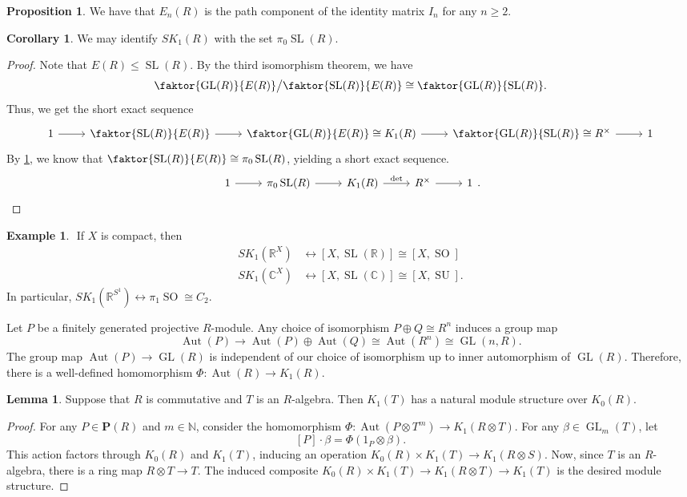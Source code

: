 \documentclass[10pt,letterpaper,cm]{nupset}
\theoremstyle{definition}
\newtheorem{exmp}[definition]{Example}
\theoremstyle{theorem}
\newtheorem{lemma}[definition]{Lemma}
\newtheorem{corollary}[definition]{Corollary}
\newtheorem{prop}[definition]{Proposition}
\theoremstyle{remark}
\newcommand{\C}{\mathbb C}
\newcommand{\N}{\mathbb N}
\renewcommand{\P}{\mathbf P}
\newcommand{\R}{\mathbb R}
\newcommand{\1}{\mathbf{1}}
\newcommand{\0}{\vec 0}
\DeclareMathOperator*{\GL}{GL}
\DeclareMathOperator*{\SL}{SL}
\DeclareMathOperator*{\SO}{SO}
\DeclareMathOperator*{\SU}{SU}
\DeclareMathOperator{\aut}{Aut}
\begin{document}
\begin{prop}\label{prev}
We have that $E_n(R)$ is the path component of the identity matrix $I_n$ for any $n\geq 2$.
\end{prop}

\begin{corollary}
We may identify $SK_1(R)$ with the set $\pi_0\SL(R)$. 
\end{corollary}
\begin{proof}
Note that $E(R)\leq \SL(R)$. By the third isomorphism theorem, we have $$ \faktor{\GL(R)}{E(R)}\big / \faktor{\SL(R)}{E(R)} \cong \faktor{\GL(R)}{\SL(R)}.$$ Thus, we get the short exact sequence 
\[
\begin{tikzcd}
1 \arrow[r] & \faktor{\SL(R)}{E(R)} \arrow[r] & \faktor{\GL(R)}{E(R)}\cong K_1(R) \arrow[r] & \faktor{\GL(R)}{\SL(R)} \cong R^{\times} \arrow[r] & 1
\end{tikzcd}
\]
By \cref{prev}, we know that $\faktor{\SL(R)}{E(R)} \cong \pi_0\SL(R)$, yielding a short exact sequence.
\[
\begin{tikzcd}
1 \arrow[r] & \pi_0\SL(R) \arrow[r] & K_1(R) \arrow[r, "\det"] & R^{\times} \arrow[r] & 1
\end{tikzcd}.
\]
\end{proof}
\begin{exmp} $ $
If $X$ is compact, then 
\begin{align*}
SK_1(\R^X) &\leftrightarrow \left[X, \SL(\R)\right] \cong \left[X, \SO\right]
\\ SK_1(\C^X) &\leftrightarrow \left[X, \SL(\C)\right] \cong \left[X, \SU\right].
\end{align*}
In particular, $SK_1(\R^{S^1}) \leftrightarrow \pi_1 \SO \cong C_2$.
\end{exmp}

\smallskip


Let $P$ be a finitely generated projective $R$-module. Any choice of isomorphism $P \oplus Q \cong R^n$ induces a group map $$\aut(P) \to \aut(P) \oplus \aut(Q) \cong \aut(R^n) \cong \GL(n,R).$$ The group map $\aut(P) \to \GL(R)$ is independent of our choice of isomorphism up to inner automorphism of $\GL(R)$. Therefore, there is a well-defined homomorphism $\Phi: \aut(R) \to K_1(R)$.


\begin{lemma}
Suppose that $R$ is commutative and $T$ is an $R$-algebra. Then $K_1(T)$ has a natural module structure over $K_0(R)$.
\end{lemma}
\begin{proof}
For any $P \in \P(R)$ and $m\in \N$, consider the homomorphism $\Phi : \aut(P \otimes T^m) \to K_1(R\otimes T).$ For any $\beta \in \GL_m(T)$, let $$\left[P\right] \cdot \beta = \Phi(1_P \otimes \beta).$$This action factors through $K_0(R)$ and $K_1(T)$, inducing an operation $K_0(R) \times K_1(T) \to K_1(R \otimes S)$. Now, since $T$ is an $R$-algebra, there is a ring map $R\otimes T \to T$. The induced composite $K_0(R) \times K_1(T) \to K_1(R \otimes T) \to K_1(T)$ is the desired module structure.
\end{proof}
\end{document}
